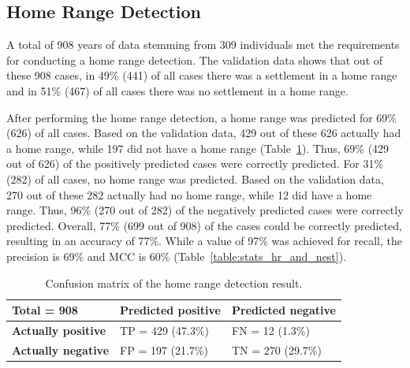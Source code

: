 \subsection{Home Range Detection}
A total of 908 years of data stemming from 309 individuals met the requirements for conducting a home range detection. The validation data shows that out of these 908 cases, in 49\% (441) of all cases there was a settlement in a home range and in 51\% (467) of all cases there was no settlement in a home range.

After performing the home range detection, a home range was predicted for 69\% (626) of all cases. Based on the validation data, 429 out of these 626 actually had a home range, while 197 did not have a home range (Table~\ref{table:conf_matrix_hr}). Thus, 69\% (429 out of 626) of the positively predicted cases were correctly predicted. For 31\% (282) of all cases, no home range was predicted. Based on the validation data, 270 out of these 282 actually had no home range, while 12 did have a home range. Thus, 96\% (270 out of 282) of the negatively predicted cases were correctly predicted. Overall, 77\% (699 out of 908) of the cases could be correctly predicted, resulting in an accuracy of 77\%. While a value of 97\% was achieved for recall, the precision is 69\% and MCC is 60\% (Table~\ref{table:stats_hr_and_nest}).

\begin{table}[H]
\begin{center}
\caption[Confusion matrix of the home range detection result]{Confusion matrix of the home range detection result.}
\label{table:conf_matrix_hr}
\begin{tabularx}{0.5\textwidth} {
    | >{\centering\arraybackslash}X 
    | >{\centering\arraybackslash}X 
    | >{\centering\arraybackslash}X | }
\hline
Total \break = 908 & \textbf{Predicted \break positive} & \textbf{Predicted \break negative} \\
\hline
\textbf{Actually \break positive} &
\cellcolor[HTML]{CCFFCC} TP = 429 \break (47.3\%) & %
\cellcolor[HTML]{FFCCCC} FN = 12 \break (1.3\%) \\  %
\hline
\textbf{Actually \break negative} &
\cellcolor[HTML]{FFCCCC} FP = 197 \break (21.7\%) &  %
\cellcolor[HTML]{CCFFCC} TN = 270 \break (29.7\%) \\ %
\hline
\end{tabularx}
\end{center}
\end{table}

